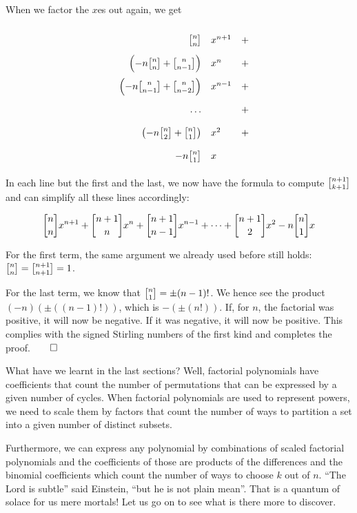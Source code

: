 \documentclass[tikz]{scrreprt}
\begin{document}
When we factor the $x$es out again, we get

\[
\begingroup
\renewcommand{\arraystretch}{2}
\begin{array}{crlc}
  &\stirlingOne{n}{n}                                      &x^{n+1}& + \\
  &\left(-n\stirlingOne{n}{n} + \stirlingOne{n}{n-1}\right)&x^n    & + \\
  &\left(-n\stirlingOne{n}{n-1}+\stirlingOne{n}{n-2}\right)&x^{n-1}& + \\
  & \dots                                                  &       & + \\
  &\left(-n\stirlingOne{n}{2} + \stirlingOne{n}{1}\right)  &x^{2}  & + \\
  &-n\stirlingOne{n}{1}                                    &x      & 
\end{array}
\endgroup
\]

In each line but the first and the last, we now have
the formula to compute $\stirlingOne{n+1}{k+1}$ and
can simplify all these lines accordingly:

\[
\stirlingOne{n}{n}x^{n+1} + 
\stirlingOne{n+1}{n}x^n  + 
\stirlingOne{n+1}{n-1}x^{n-1} + 
\dots + 
\stirlingOne{n+1}{2}x^{2} 
-n \stirlingOne{n}{1}x
\]

For the first term, the same argument 
we already used before still holds:
$\stirlingOne{n}{n} = \stirlingOne{n+1}{n+1} = 1$.

For the last term, we know that 
$\stirlingOne{n}{1} = \pm(n-1)!$.
We hence see the product 
$(-n)(\pm((n-1)!))$, which is $-(\pm(n!))$.
If, for $n$, the factorial was positive,
it will now be negative. If it was negative,
it will now be positive.
This complies with the signed Stirling numbers
of the first kind and completes the proof.$\qed$

What have we learnt in the last sections?
Well, factorial polynomials have coefficients
that count the number of permutations
that can be expressed by a given number of cycles.
When factorial polynomials are used to represent
powers, we need to scale them by factors
that count the number of ways to partition a set
into a given number of distinct subsets.

Furthermore, we can express any polynomial
by combinations of scaled factorial polynomials
and the coefficients of those
are products of the differences and
the binomial coefficients which count
the number of ways to choose $k$ out of $n$.
``The Lord is subtle'' said Einstein,
``but he is not plain mean''.
That is a quantum of solace for us mere mortals!
Let us go on to see
what is there more to discover.
\end{document}
